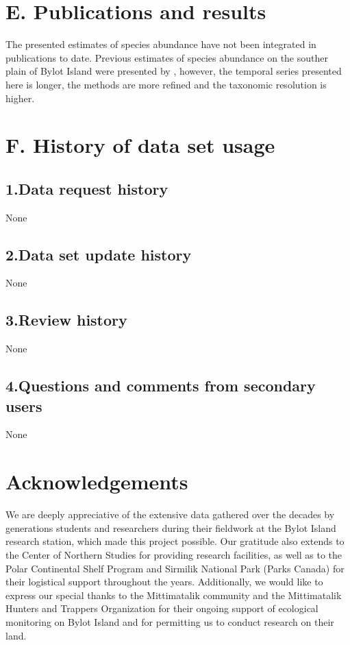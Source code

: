 \documentclass[a4paper,twoside,12pt]{article}
\begin{document}
    \section*{E. Publications and results}
The presented estimates of species abundance have not been integrated in publications to date. Previous estimates of species abundance on the souther plain of Bylot Island were presented by \citet{legagneux2012}, however, the temporal series presented here is longer, the methods are more refined and the taxonomic resolution is higher.
   
   \section*{F. History of data set usage}
       \subsection*{1.Data request history} None
       \subsection*{2.Data set update history} None
       \subsection*{3.Review history}  None
       \subsection*{4.Questions and comments from secondary users} None
   
   \section*{Acknowledgements}
We are deeply appreciative of the extensive data gathered over the decades by generations students and researchers during their fieldwork at the Bylot Island research station, which made this project possible. Our gratitude also extends to the Center of Northern Studies for providing research facilities, as well as to the Polar Continental Shelf Program and Sirmilik National Park (Parks Canada) for their logistical support throughout the years. Additionally, we would like to express our special thanks to the Mittimatalik community and the Mittimatalik Hunters and Trappers Organization for their ongoing support of ecological monitoring on Bylot Island and for permitting us to conduct research on their land.
   
\clearpage

\end{document}
